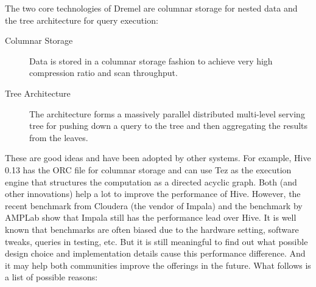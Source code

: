 \documentclass[12pt]{book}
\begin{document}
The two core technologies of Dremel are columnar storage for nested data and the tree architecture for query execution:
\begin{description}
\item[Columnar Storage]
Data is stored in a columnar storage fashion to achieve very high compression ratio and scan throughput.
\item[Tree Architecture]
The architecture forms a massively parallel distributed multi-level serving tree for pushing down a query to the tree and then aggregating the results from the leaves.
\end{description}
These are good ideas and have been adopted by other systems. For example, Hive 0.13 has the ORC file for columnar storage and can use Tez as the execution engine that structures the computation as a directed acyclic graph. Both (and other innovations) help a lot to improve the performance of Hive. However, the recent benchmark from Cloudera (the vendor of Impala) \cite{ClouderaImpala2014} and the benchmark by AMPLab \cite{AMPLabBenchmark2014} show that Impala still has the performance lead over Hive. It is well known that benchmarks are often biased due to the hardware setting, software tweaks, queries in testing, etc. But it is still meaningful to find out what possible design choice and implementation details cause this performance difference. And it may help both communities improve the offerings in the future. What follows is a list of possible reasons:
\end{document}
